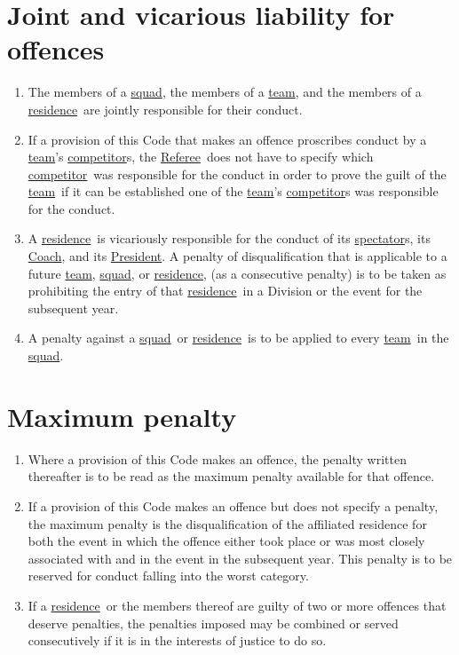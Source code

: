 \documentclass[12pt]{report}
\makeatletter
\newcommand{\nop}[1]{\Hy@raisedlink{\hypertarget{#1}{}}}
\newcommand{\hyplink}[1]{\hyperlink{#1}{{#1}}}
\newcommand{\defi}[1]{\nop{#1}{\textbf{\emph{#1}}}\index{#1}}
\newcommand{\Captain}{\hyplink{Coach}}
\newcommand{\Coach}{\hyplink{Coach}}\newcommand{\xCaptain}{Coach}
\newcommand{\competitor}{\hyplink{competitor}}
\newcommand\President{\hyplink{President}}\newcommand\xPresident{President}
\newcommand{\Referee}{\hyplink{Referee}}
\newcommand{\residence}{\hyplink{residence}}
\newcommand{\spectator}{\hyplink{spectator}}
\newcommand{\squad}{\hyplink{squad}}
\newcommand{\team}{\hyplink{team}}
\makeatother
\begin{document}
  \section{Joint and vicarious liability for offences}
  \begin{enumerate}
    \item The members of a \squad, the members of a \team, and the members of a \residence\ are jointly responsible for their conduct.
    \item If a provision of this Code that makes an offence proscribes conduct by a \team's \competitor s, the \Referee\ does not have to specify which \competitor\ was responsible for the conduct in order to prove the guilt of the \team\ if it can be established one of the \team's \competitor s was responsible for the conduct.
    \item A \residence\ is vicariously responsible for the conduct of its \spectator s, its \Coach, and its \President. A penalty of disqualification that is applicable to a future \team, \squad, or \residence, (as a consecutive penalty) is to be taken as prohibiting the entry of that \residence\ in a Division or the event for the subsequent year.
  \item A penalty against a \squad\ or \residence\ is to be applied to every \team\ in the \squad.

  \end{enumerate}
  \section{Maximum penalty}
  \begin{enumerate} \item
  Where a provision of this Code makes an offence, the penalty written thereafter is to be read as the maximum penalty available for that offence.
  \item If a provision of this Code makes an offence but does not specify a penalty, the maximum penalty is the disqualification of the affiliated residence for both the event in which the offence either took place or was most closely associated with and in the event in the subsequent year. This penalty is to be reserved for conduct falling into the worst category.
  \item If a \residence\ or the members thereof are guilty of two or more offences that deserve penalties, the penalties imposed may be combined or served consecutively if it is in the interests of justice to do so.
  \end{enumerate}
\end{document}
